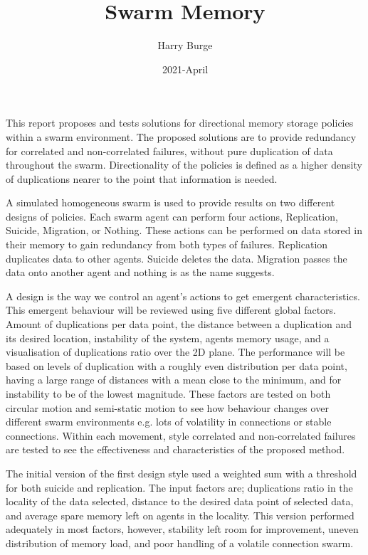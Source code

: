 \documentclass{UoYCSproject}
\author{Harry Burge}
\title{Swarm Memory}
\date{2021-April}
\begin{document}
\maketitle
\listoffigures



\begin{summary}
This report proposes and tests solutions for directional memory storage policies within a swarm environment. The proposed solutions are to provide redundancy for correlated and non-correlated failures, without pure duplication of data throughout the swarm. Directionality of the policies is defined as a higher density of duplications nearer to the point that information is needed.

A simulated homogeneous swarm is used to provide results on two different designs of policies. Each swarm agent can perform four actions, Replication, Suicide, Migration, or Nothing. These actions can be performed on data stored in their memory to gain redundancy from both types of failures. Replication duplicates data to other agents. Suicide deletes the data. Migration passes the data onto another agent and nothing is as the name suggests.

A design is the way we control an agent's actions to get emergent characteristics. This emergent behaviour will be reviewed using five different global factors. Amount of duplications per data point, the distance between a duplication and its desired location, instability of the system, agents memory usage, and a visualisation of duplications ratio over the 2D plane. The performance will be based on levels of duplication with a roughly even distribution per data point, having a large range of distances with a mean close to the minimum, and for instability to be of the lowest magnitude. These factors are tested on both circular motion and semi-static motion to see how behaviour changes over different swarm environments e.g. lots of volatility in connections or stable connections. Within each movement, style correlated and non-correlated failures are tested to see the effectiveness and characteristics of the proposed method.

The initial version of the first design style used a weighted sum with a threshold for both suicide and replication. The input factors are; duplications ratio in the locality of the data selected, distance to the desired data point of selected data, and average spare memory left on agents in the locality. This version performed adequately in most factors, however, stability left room for improvement, uneven distribution of memory load, and poor handling of a volatile connection swarm.


\end{summary}
\end{document}
